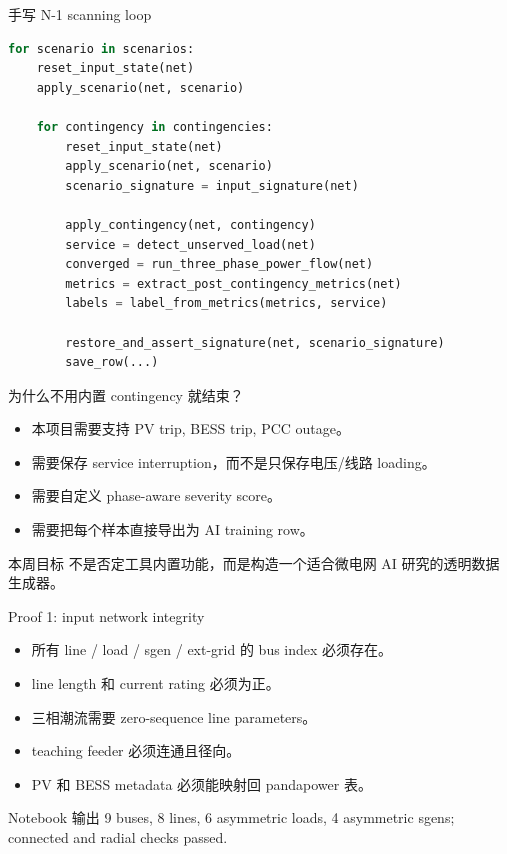 \documentclass[aspectratio=169,11pt]{beamer}
\begin{document}
\begin{frame}[fragile]{手写 N-1 scanning loop}
\begin{lstlisting}[language=Python]
for scenario in scenarios:
    reset_input_state(net)
    apply_scenario(net, scenario)

    for contingency in contingencies:
        reset_input_state(net)
        apply_scenario(net, scenario)
        scenario_signature = input_signature(net)

        apply_contingency(net, contingency)
        service = detect_unserved_load(net)
        converged = run_three_phase_power_flow(net)
        metrics = extract_post_contingency_metrics(net)
        labels = label_from_metrics(metrics, service)

        restore_and_assert_signature(net, scenario_signature)
        save_row(...)
\end{lstlisting}
\end{frame}

\begin{frame}{为什么不用内置 contingency 就结束？}
\begin{itemize}
  \item 本项目需要支持 PV trip, BESS trip, PCC outage。
  \item 需要保存 service interruption，而不是只保存电压/线路 loading。
  \item 需要自定义 phase-aware severity score。
  \item 需要把每个样本直接导出为 AI training row。
\end{itemize}
\begin{block}{本周目标}
不是否定工具内置功能，而是构造一个适合微电网 AI 研究的透明数据生成器。
\end{block}
\end{frame}

\begin{frame}{Proof 1: input network integrity}
\begin{itemize}
  \item 所有 line / load / sgen / ext-grid 的 bus index 必须存在。
  \item line length 和 current rating 必须为正。
  \item 三相潮流需要 zero-sequence line parameters。
  \item teaching feeder 必须连通且径向。
  \item PV 和 BESS metadata 必须能映射回 pandapower 表。
\end{itemize}
\begin{exampleblock}{Notebook 输出}
9 buses, 8 lines, 6 asymmetric loads, 4 asymmetric sgens; connected and radial checks passed.
\end{exampleblock}
\end{frame}
\end{document}
